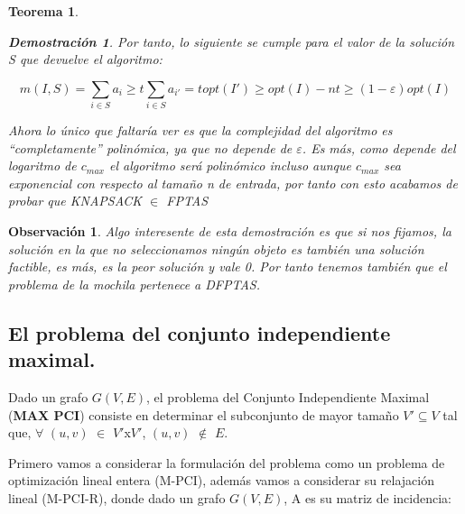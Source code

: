 \documentclass[a4paper,12pt,titlepage]{article}
\newtheorem{obs}{Observaci\'on}[section]
\newtheorem{teo}{Teorema}[section]
\newtheorem*{dem}{\textbf{Demostraci\'on}}
\begin{document}
\begin{teo}
\begin{dem}
Por tanto, lo siguiente se cumple para el valor de la soluci\'on S que devuelve el algoritmo:

\begin{equation} \label{knap:eq:7}
m(I,S) = \sum_{i\in{S}}a_i \geq t\sum_{i\in{S}}a_{i'} = t{opt}(I') \geq opt(I) - nt \geq (1-\varepsilon)opt(I)
\end{equation}

Ahora lo \'unico que faltar\'ia ver es que la complejidad del algoritmo es ``completamente'' polin\'omica, ya que no depende de $\varepsilon$. Es m\'as, como depende del logaritmo de $c_{max}$ el algoritmo ser\'a polin\'omico incluso aunque $c_{max}$ sea exponencial con respecto al tamaño n de entrada, por tanto con esto acabamos de probar que KNAPSACK $\in$ FPTAS

\end{dem}
\end{teo}

\begin{obs}

Algo interesente de esta demostraci\'on es que si nos fijamos, la soluci\'on en la que no seleccionamos ning\'un objeto es tambi\'en una soluci\'on factible, es m\'as, es la peor soluci\'on y vale 0. Por tanto tenemos tambi\'en que el problema de la mochila pertenece a DFPTAS.

\end{obs}

\subsection{El problema del conjunto independiente maximal.}\label{pciT}

Dado un grafo $G(V,E)$, el problema del Conjunto Independiente Maximal (\textbf{MAX PCI}) consiste en determinar el subconjunto de mayor tamaño $V'\subseteq V$ tal que, $\forall$ $(u,v)$ $\in$ $V'$x$V'$, $(u,v)$ $\notin$ $E$.

Primero vamos a considerar la formulaci\'on del problema como un problema de optimizaci\'on lineal entera (M-PCI), adem\'as vamos a considerar su relajaci\'on lineal (M-PCI-R), donde dado un grafo $G(V,E)$, A es su matriz de incidencia:

\vspace{\baselineskip}
\end{document}
